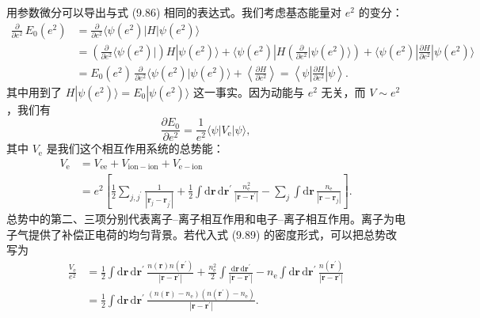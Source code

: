 用参数微分可以导出与式 (9.86) 相同的表达式。我们考虑基态能量对 $e^2$ 的变分：
\begin{equation*}
\begin{aligned}
\frac{\partial}{\partial e^2}\,E_0(e^2)&=\frac{\partial}{\partial e^2}\langle\psi(e^2)|H|\psi(e^2)\rangle\\
&=\left(\frac{\partial}{\partial e^2}\langle\psi(e^2)|\right)H|\psi(e^2)\rangle+\langle\psi(e^2)|H\left(\frac{\partial}{\partial e^2}|\psi(e^2)\rangle\right)+\langle\psi(e^2)|\frac{\partial H}{\partial e^2}|\psi(e^2)\rangle\\
&=E_0(e^2)\,\frac{\partial}{\partial e^2}\langle\psi(e^2)|\psi(e^2)\rangle+\left\langle\frac{\partial H}{\partial e^2}\right\rangle=\left\langle\psi\left|\frac{\partial H}{\partial e^2}\right|\psi\right\rangle.
\end{aligned}\tag{9.94}
\end{equation*}
其中用到了 $H|\psi(e^2)\rangle=E_0|\psi(e^2)\rangle$ 这一事实。因为动能与 $e^2$ 无关，而 $V\sim e^2$，我们有
\begin{equation*}
\frac{\partial E_0}{\partial e^2}=\frac{1}{e^2}\langle\psi|V_{\mathrm{e}}|\psi\rangle,\tag{9.95}
\end{equation*}
其中 $V_{\mathrm{e}}$ 是我们这个相互作用系统的总势能：
\begin{equation*}
\begin{aligned}
V_{\mathrm{e}}&=V_{\mathrm{ee}}+V_{\mathrm{ion-ion}}+V_{\mathrm{e-ion}}\\
&=e^2\left[\frac{1}{2}\sum_{j,j^{\prime}}\frac{1}{|\mathbf{r}_j-\mathbf{r}_{j^{\prime}}|}+\frac{1}{2}\int\mathrm{d}\mathbf{r}\,\mathrm{d}\mathbf{r}^{\prime}\,\frac{n_{\mathrm{e}}^2}{|\mathbf{r}-\mathbf{r}^{\prime}|}-\sum_j\int\mathrm{d}\mathbf{r}\,\frac{n_{\mathrm{e}}}{|\mathbf{r}-\mathbf{r}_j|}\right].
\end{aligned}\tag{9.96}
\end{equation*}
总势中的第二、三项分别代表离子–离子相互作用和电子–离子相互作用。离子为电子气提供了补偿正电荷的均匀背景。若代入式 (9.89) 的密度形式，可以把总势改写为
\begin{equation*}
\begin{aligned}
\frac{V_{\mathrm{e}}}{e^2}&=\frac{1}{2}\int\mathrm{d}\mathbf{r}\,\mathrm{d}\mathbf{r}^{\prime}\,\frac{n(\mathbf{r})n(\mathbf{r}^{\prime})}{|\mathbf{r}-\mathbf{r}^{\prime}|}+\frac{n_{\mathrm{e}}^2}{2}\int\frac{\mathrm{d}\mathbf{r}\,\mathrm{d}\mathbf{r}^{\prime}}{|\mathbf{r}-\mathbf{r}^{\prime}|}-n_{\mathrm{e}}\int\mathrm{d}\mathbf{r}\,\mathrm{d}\mathbf{r}^{\prime}\,\frac{n(\mathbf{r}^{\prime})}{|\mathbf{r}-\mathbf{r}^{\prime}|}\\
&=\frac{1}{2}\int\mathrm{d}\mathbf{r}\,\mathrm{d}\mathbf{r}^{\prime}\,\frac{(n(\mathbf{r})-n_{\mathrm{e}})\left(n(\mathbf{r}^{\prime})-n_{\mathrm{e}}\right)}{|\mathbf{r}-\mathbf{r}^{\prime}|}.
\end{aligned}\tag{9.97}
\end{equation*}
